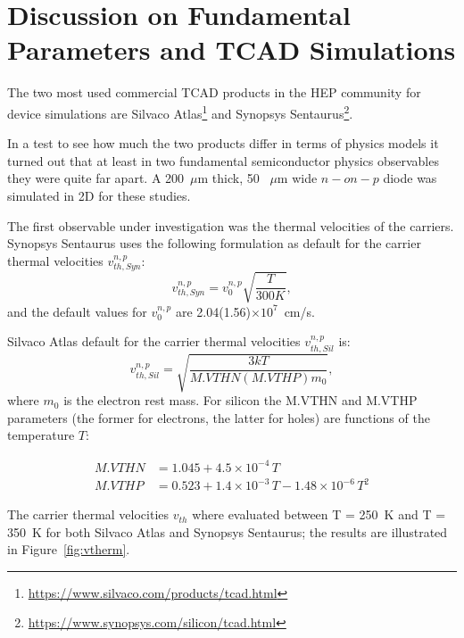 \section{Discussion on Fundamental Parameters and TCAD Simulations}
\label{sec:TCADfund}
The two most used commercial TCAD products in the HEP community for device simulations 
are Silvaco Atlas\footnote{\url{https://www.silvaco.com/products/tcad.html}} and Synopsys 
Sentaurus\footnote{\url{https://www.synopsys.com/silicon/tcad.html}}.

In a test to see how much the two products differ in terms of physics models it turned out 
that at least in two fundamental semiconductor physics observables they were quite far apart. 
A  200~$\mu$m thick,  50 ~$\mu$m wide $n-on-p$ diode was simulated in 2D for these studies.



The first observable under investigation was the thermal velocities of the carriers. 
Synopsys Sentaurus uses the following formulation as default for the carrier thermal velocities $v_{th,Syn}^{n,p}$:
\begin{equation}
v_{th,Syn}^{n,p} = v_0^{n,p}\sqrt{\dfrac{T}{300 K}},
\label{eq:SynThVel}
\end{equation}
and the default values for $v_0^{n,p}$ are 2.04(1.56)$\times10^{7}$~cm/s.

Silvaco Atlas default for the carrier thermal velocities $v_{th,Sil}^{n,p}$ is:
\begin{equation}
v_{th,Sil}^{n,p} = \sqrt{\dfrac{3kT}{M.VTHN(M.VTHP)m_0}},
\label{eq:SilThVel}
\end{equation}
where $m_0$ is the electron rest mass. 
For silicon the M.VTHN and M.VTHP parameters (the former for electrons, the latter for holes) 
 are functions of the temperature $T$:

\begin{align}
M.VTHN & = 1.045 + 4.5\times10^{-4}\,T\\
M.VTHP & =    0.523 + 1.4 \times10^{-3}\,T -1.48\times10^{-6}\,T^2
\end{align}

The carrier thermal velocities $v_{th}$ where evaluated between T = 250~K and T = 350~K for both 
Silvaco Atlas and Synopsys Sentaurus; 
the results 
are illustrated in Figure~\ref{fig:vtherm}.

